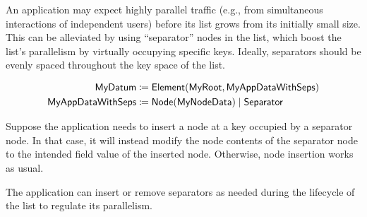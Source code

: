 \documentclass[../midgard.tex]{subfiles}
\begin{document}
An application may expect highly parallel traffic (e.g., from simultaneous interactions of independent users) before its list grows from its initially small size.
This can be alleviated by using ``separator'' nodes in the list, which boost the list's parallelism by virtually occupying specific keys.
Ideally, separators should be evenly spaced throughout the key space of the list.

\begin{align*}
  \mathsf{MyDatum} &\coloneq \mathsf{Element} (\mathsf{MyRoot}, \mathsf{MyAppDataWithSeps}) \\
    \mathsf{MyAppDataWithSeps} &\coloneq \mathsf{Node}(\mathsf{MyNodeData}) \;|\;
        \mathsf{Separator}
\end{align*}

Suppose the application needs to insert a node at a key occupied by a separator node.
In that case, it will instead modify the node contents of the separator node to the intended  field value of the inserted node.
Otherwise, node insertion works as usual.

The application can insert or remove separators as needed during the lifecycle of the list to regulate its parallelism.
\end{document}
